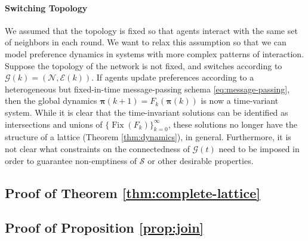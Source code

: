 \documentclass[conference]{ieeeconf}
\newcommand{\N}{\mathcal{N}}
\newcommand{\A}{\mathcal{A}}
\renewcommand{\SS}{\mathcal{S}}
\newcommand{\G}{\mathcal{G}}
\newcommand{\E}{\mathcal{E}}
\newcommand{\Pref}{\mathsf{Pre}}
\newcommand{\profile}{\boldsymbol{\pi}}
\renewcommand{\geq}{\geqslant}
\DeclareMathOperator{\Fix}{Fix}
\newtheorem{proposition}{Proposition}
\begin{document}
\paragraph*{Switching Topology}
We assumed that the topology is fixed so that agents interact with the same set of neighbors in each round. We want to relax this assumption so that we can model preference dynamics in systems with more complex patterns of interaction. Suppose the topology of the network is not fixed, and switches according to $\G(k) = \left(\N, \E(k)\right)$. If agents update preferences according to a heterogeneous but fixed-in-time message-passing schema \eqref{eq:message-passing}, then the global dynamics $\profile(k+1) = F_k\left( \profile(k)\right)$ is now a time-variant system.
While it is clear that the time-invariant solutions can be identified as intersections and unions of $\{\Fix(F_k)\}_{k = 0}^{\infty}$, these solutions no longer have the structure of a lattice (Theorem \ref{thm:dynamics}), in general. Furthermore, it is not clear what constraints on the connectedness of $\G(t)$ need to be imposed in order to guarantee  non-emptiness of $\SS$ or other desirable properties.





\appendix

\subsection*{Proof of Theorem \ref{thm:complete-lattice}}

\subsection*{Proof of Proposition \ref{prop:join}}
\end{document}
